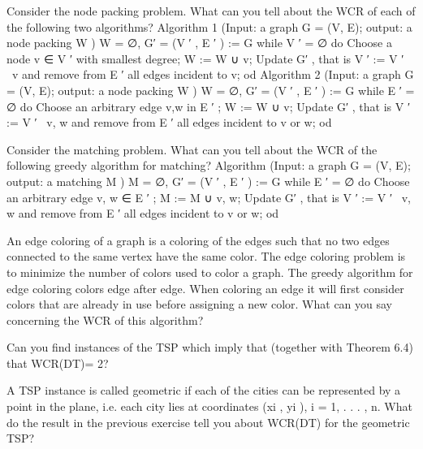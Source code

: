 \begin{exercise}
Consider the node packing problem. What can you tell about the WCR of each of the following two
algorithms?
Algorithm 1 (Input: a graph G = (V, E); output: a node packing W )
W = ∅, G′ = (V ′ , E ′ ) := G
while V ′ = ∅
do
Choose a node v ∈ V ′ with smallest degree;
W := W ∪ {v};
Update G′ , that is V ′ := V ′ \ {v} and remove from E ′ all edges incident to v;
od
Algorithm 2 (Input: a graph G = (V, E); output: a node packing W )
W = ∅, G′ = (V ′ , E ′ ) := G
while E ′ = ∅
do
Choose an arbitrary edge {v,w} in E ′ ;
W := W ∪ {v};
Update G′ , that is V ′ := V ′ \ {v, w} and remove from E ′ all edges incident to v or w;
od
\end{exercise}

\begin{exercise}
Consider the matching problem. What can you tell about the WCR of the following greedy algorithm
for matching?
Algorithm (Input: a graph G = (V, E); output: a matching M )
M = ∅, G′ = (V ′ , E ′ ) := G
while E ′ = ∅
do
Choose an arbitrary edge {v, w} ∈ E ′ ;
M := M ∪ {v, w};
Update G′ , that is V ′ := V ′ \ {v, w} and remove from E ′ all edges incident to v or w;
od
\end{exercise}

\begin{exercise}
An edge coloring of a graph is a coloring of the edges such that no two edges connected to the same
vertex have the same color. The edge coloring problem is to minimize the number of colors used to color
a graph. The greedy algorithm for edge coloring colors edge after edge. When coloring an edge it will
first consider colors that are already in use before assigning a new color. What can you say concerning
the WCR of this algorithm?
\end{exercise}

\begin{exercise}
Can you find instances of the TSP which imply that (together with Theorem 6.4) that WCR(DT)= 2?
\end{exercise}

\begin{exercise}
A TSP instance is called geometric if each of the cities can be represented by a point in the plane, i.e.
each city lies at coordinates (xi , yi ), i = 1, . . . , n. What do the result in the previous exercise tell you
about WCR(DT) for the geometric TSP?
\end{exercise}